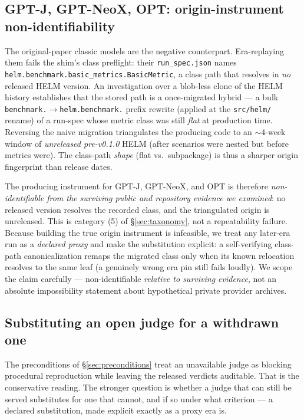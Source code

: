 \subsection{GPT-J, GPT-NeoX, OPT: origin-instrument non-identifiability}
\label{sec:classic}

The original-paper classic models
\citep{wang2021gptj,black2022gptneox,zhang2022opt} are the negative counterpart.
Era-replaying them
fails the shim's class preflight: their \texttt{run\_spec.json} names
\texttt{helm.benchmark.basic\_metrics.BasicMetric}, a class path that resolves in
\emph{no} released HELM version. An investigation over a blob-less clone of the
HELM history establishes that the stored path is a once-migrated hybrid --- a bulk
\texttt{benchmark.}$\to$\texttt{helm.benchmark.} prefix rewrite (applied at the
\texttt{src/helm/} rename) of a run-spec whose metric class was still \emph{flat} at
production time. Reversing the naive migration triangulates the producing code to
an ${\sim}$4-week window of \emph{unreleased pre-v0.1.0} HELM (after scenarios
were nested but before metrics were). The class-path \emph{shape} (flat vs.\
subpackage) is thus a sharper origin fingerprint than release dates.

The producing instrument for GPT-J, GPT-NeoX, and OPT is therefore
\emph{non-identifiable from the surviving public and repository evidence we
examined}: no released version resolves the recorded class, and the triangulated
origin is unreleased. This is category (5) of \S\ref{sec:taxonomy}, not a
repeatability failure. Because
building the true origin instrument is infeasible, we treat any later-era run as a
\emph{declared proxy} and make the substitution explicit: a self-verifying
class-path canonicalization remaps the migrated class only when its known
relocation resolves to the same leaf (a genuinely wrong era pin still fails
loudly). We scope the claim carefully --- non-identifiable \emph{relative to
surviving evidence}, not an absolute impossibility statement about hypothetical
private provider archives.

\subsection{Substituting an open judge for a withdrawn one}
\label{sec:openjudge}

The preconditions of \S\ref{sec:preconditions} treat an unavailable judge as
blocking procedural reproduction while leaving the released verdicts auditable.
That is the conservative reading. The stronger question is whether a judge that
can still be served substitutes for one that cannot, and if so under what
criterion --- a declared substitution, made explicit exactly as a proxy era is.

